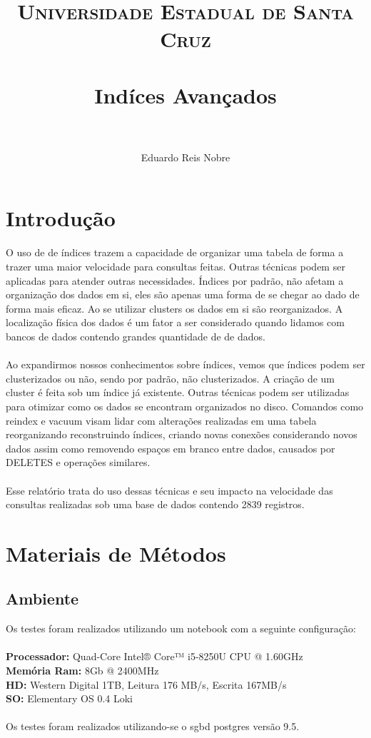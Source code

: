 \documentclass[12pt, a4paper, twoside, titlepage]{article}
\title{
		\normalfont \normalsize \textsc{Universidade Estadual de Santa Cruz} \\ [25pt]
		\horrule{0.5pt} \\[0.4cm]
		\huge Indíces Avançados\\
		\horrule{2pt} \\[0.5cm]
}
\author{
	\normalfont 								\normalsize
	Eduardo Reis Nobre\\[-3pt]		\normalsize
}
\begin{document}
\maketitle



\tableofcontents %
\clearpage

\section{Introdução}
O uso de de índices trazem a capacidade de organizar uma tabela de forma a trazer uma maior velocidade para consultas feitas. Outras técnicas podem ser aplicadas para atender outras necessidades. Índices por padrão, não afetam a organização dos dados em si, eles são apenas uma forma de se chegar ao dado de forma mais eficaz. Ao se utilizar clusters os dados em si são reorganizados. A localização física dos dados é um fator a ser considerado quando lidamos com bancos de dados contendo grandes quantidade de de dados.
\\\\
Ao expandirmos nossos conhecimentos sobre índices, vemos que índices podem ser clusterizados ou não, sendo por padrão, não clusterizados. A criação de um cluster é feita sob um índice já existente. Outras técnicas podem ser utilizadas para otimizar como os dados se encontram organizados no disco. Comandos como reindex e vacuum visam lidar com alterações realizadas em uma tabela reorganizando reconstruindo índices, criando novas conexões considerando novos dados assim como removendo espaços em branco entre dados, 
causados por DELETES e operações similares.
\\\\
Esse relatório trata do uso dessas técnicas e seu impacto na velocidade das consultas realizadas sob uma base de dados contendo 2839 registros.

\section{Materiais de Métodos}
\subsection{Ambiente}
Os \cite{DUMMY:1} testes foram realizados utilizando um notebook com a seguinte configuração:\\\\
\textbf{\textbf{}Processador:} Quad-Core Intel® Core™ i5-8250U CPU @ 1.60GHz\\ 
\textbf{\textbf{}Memória Ram:} 8Gb @ 2400MHz\\
\textbf{HD:} Western Digital 1TB, Leitura 176 MB/s, Escrita 167MB/s\\
\textbf{SO:} Elementary OS 0.4 Loki 
\\\\
Os testes foram realizados utilizando-se o sgbd postgres versão 9.5.
\end{document}
